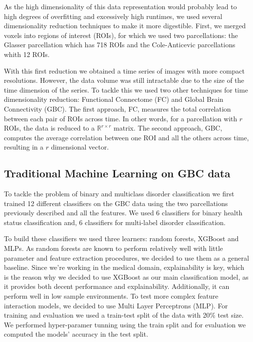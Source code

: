 \documentclass[fleqn,moreauthors,10pt]{ds_report}
\begin{document}
As the high dimensionality of this data representation would probably lead to high degrees of overfitting and excessively high runtimes, we used several dimensionality reduction techniques to make it more digestible. First, we merged voxels into regions of interest (ROIs), for which we used two parcellations: the Glasser parcellation which has 718 ROIs and the Cole-Anticevic parcellations whith 12 ROIs.

With this first reduction we obtained a time series of images with more compact resolutions. However, the data volume was still intractable due to the size of the time dimension of the series. To tackle this we used two other techniques for time dimensionality reduction: Functional Connectome (FC) and Global Brain Connectivity (GBC). The first approach, FC, measures the total correlation between each pair of ROIs across time. In other words, for a parcellation with $r$ ROIs, the data is reduced to a $\mathbb{R}^{r\times r}$ matrix. The second approach, GBC, computes the average correlation between one ROI and all the others across time, resulting in a $r$ dimensional vector. 

\subsection*{Traditional Machine Learning on GBC data}

To tackle the problem of binary and multiclass disorder classification we first trained 12 different classifiers on the GBC data using the two parcellations previously described and all the features. We used 6 classifiers for binary health status classification and, 6 classifiers for multi-label disorder classification. 

To build these classifiers we used three learners: random forests, XGBoost and MLPs. As random forests are known to perform relatively well with little parameter and feature extraction procedures, we decided to use them as a general baseline. Since we're working in the medical domain, explainability is key, which is the reason why we decided to use XGBoost as our main classification model, as it provides both decent performance and explainability. Additionally, it can perform well in low sample environments. To test more complex feature interaction models, we decided to use Multi Layer Perceptrons (MLP). For training and evaluation we used a train-test split of the data with 20\% test size. We performed hyper-paramer tunning using the train split and for evaluation we computed the models' accuracy in the test split.
\end{document}
